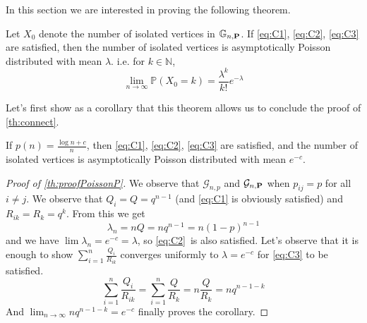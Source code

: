 In this section we are interested in proving the following theorem.
\begin{theorem}\label{th:CVIsolPoi}
	Let $X_0$ denote the number of isolated vertices in $\mathbb{G}_{n, \bold{P}}$. If \eqref{eq:C1}, \eqref{eq:C2}, \eqref{eq:C3} are satisfied, 
	then the number of isolated vertices is asymptotically Poisson distributed with mean $\lambda$.
	\newline
	i.e. for $k \in \mathbb{N}$, 
	\begin{equation}
		\lim_{n \to \infty} \mathbb{P}(X_0 = k) = \frac{\lambda^k}{k!}e^{-\lambda}
	\end{equation}
\end{theorem}
Let's first show as a corollary that this theorem allows us to conclude the proof of \ref{th:connect}.
\begin{corollary}\label{th:proofPoissonP}
	If $p(n) = \frac{\log n + c}{n}$, then \eqref{eq:C1}, \eqref{eq:C2}, \eqref{eq:C3} are satisfied, 
	and the number of isolated vertices is asymptotically Poisson distributed with mean $e^{-c}$.
\end{corollary}
\begin{proof}[Proof of \ref{th:proofPoissonP}]
	We observe that $\mathcal{G}_{n,p}$ and $\mathcal{G}_{n, \bold{P}}$ when $p_{ij} = p$ for all $i \neq j$.
	\newline
	We observe that $Q_i = Q = q^{n-1}$ (and \eqref{eq:C1} is obviously satisfied) and $R_{ik} = R_k = q^k$. 
	From this we get
	\begin{equation}
		\lambda_n = n Q = nq^{n-1} = n(1-p)^{n-1}
	\end{equation}
	and we have $\lim \lambda_n = e^{-c} = \lambda$, so \eqref{eq:C2} is also satisfied.
	\newline
	Let's observe that it is enough to show $\sum_{i=1}^n \frac{Q_i}{R_{ik}}$ converges uniformly to $\lambda = e^{-c}$ for \eqref{eq:C3} to be satisfied.
	\begin{equation}
		\sum_{i=1}^n \frac{Q_i}{R_{ik}} = \sum_{i=1}^n \frac{Q}{R_k} = n \frac{Q}{R_k} = nq^{n-1-k}
	\end{equation}
	And $\lim_{n \to \infty}  nq^{n-1-k} = e^{-c}$ finally proves the corollary.
\end{proof}
